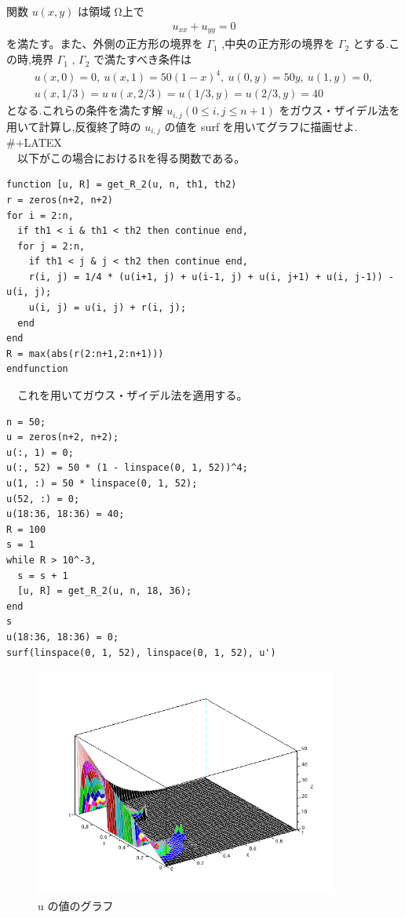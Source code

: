 \documentclass[a4j, 11pt]{jarticle}
\begin{document}
\subsection{}
\label{sec:orgcde8670}
関数 \(u(x, y)\) は領域 Ω上で\\
\begin{eqnarray*}
u_{xx} + u_{yy} = 0
\end{eqnarray*}
  を満たす。また、外側の正方形の境界を \(\Gamma_1\) ,中央の正方形の境界を \(\Gamma_2\) とする.こ\\
の時,境界 \(\Gamma_1\) , \(\Gamma_2\) で満たすべき条件は\\
\begin{eqnarray*}
u(x, 0) = 0,\ u(x, 1) = 50(1 − x)^4 ,\ u(0, y) = 50y,\ u(1, y) = 0, \\
u(x, 1/3) = u \ u(x, 2/3) = u(1/3, y) = u(2/3, y) = 40\ 
\end{eqnarray*}
となる.これらの条件を満たす解 \(u_{i,j} (0 \leq i, j \leq n + 1)\) をガウス・ザイデル法を用いて計算し,反復終了時の \(u_{i,j}\) の値を surf を用いてグラフに描画せよ.\\
\#+LATEX \newline\\
　以下がこの場合におけるRを得る関数である。\\
\begin{verbatim}
function [u, R] = get_R_2(u, n, th1, th2)
r = zeros(n+2, n+2)
for i = 2:n,
  if th1 < i & th1 < th2 then continue end,
  for j = 2:n,
    if th1 < j & j < th2 then continue end, 
    r(i, j) = 1/4 * (u(i+1, j) + u(i-1, j) + u(i, j+1) + u(i, j-1)) - u(i, j);
    u(i, j) = u(i, j) + r(i, j);
  end
end
R = max(abs(r(2:n+1,2:n+1)))
endfunction
\end{verbatim}
　これを用いてガウス・ザイデル法を適用する。\\
\begin{verbatim}
n = 50;
u = zeros(n+2, n+2);
u(:, 1) = 0;
u(:, 52) = 50 * (1 - linspace(0, 1, 52))^4;
u(1, :) = 50 * linspace(0, 1, 52);
u(52, :) = 0;
u(18:36, 18:36) = 40;
R = 100
s = 1
while R > 10^-3,
  s = s + 1
  [u, R] = get_R_2(u, n, 18, 36);
end
s
u(18:36, 18:36) = 0;
surf(linspace(0, 1, 52), linspace(0, 1, 52), u')   
\end{verbatim}
\begin{figure}[htbp]
\centering
\includegraphics[width=10cm]{./2-2.png}
\caption{u の値のグラフ}
\end{figure}
\end{document}
